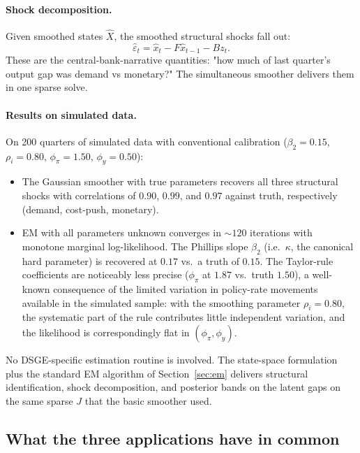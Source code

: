 \documentclass[11pt]{article}
\begin{document}
\paragraph{Shock decomposition.}  Given smoothed states $\widehat X$,
the smoothed structural shocks fall out:
\begin{equation}
\widehat\varepsilon_t=\widehat x_t-F\widehat x_{t-1}-B z_t.
\end{equation}
These are the central-bank-narrative quantities: "how much of last
quarter's output gap was demand vs monetary?"  The simultaneous
smoother delivers them in one sparse solve.

\paragraph{Results on simulated data.}  On 200 quarters of simulated
data with conventional calibration ($\beta_2=0.15$, $\rho_i=0.80$,
$\phi_\pi=1.50$, $\phi_y=0.50$):

\begin{itemize}[leftmargin=2em]
\item The Gaussian smoother with true parameters recovers all three
  structural shocks with correlations of $0.90$, $0.99$, and $0.97$
  against truth, respectively (demand, cost-push, monetary).
\item EM with all parameters unknown converges in $\sim 120$
  iterations with monotone marginal log-likelihood.  The Phillips
  slope $\beta_2$ (i.e.\ $\kappa$, the canonical hard parameter) is
  recovered at $0.17$ vs.\ a truth of $0.15$.  The Taylor-rule
  coefficients are noticeably less precise ($\phi_\pi$ at $1.87$
  vs.\ truth $1.50$), a well-known consequence of the limited
  variation in policy-rate movements available in the simulated
  sample: with the smoothing parameter $\rho_i=0.80$, the
  systematic part of the rule contributes little independent
  variation, and the likelihood is correspondingly flat in
  $(\phi_\pi,\phi_y)$.
\end{itemize}

No DSGE-specific estimation routine is involved.  The state-space
formulation plus the standard EM algorithm of Section~\ref{sec:em}
delivers structural identification, shock decomposition, and
posterior bands on the latent gaps on the same sparse $J$ that the
basic smoother used.

\subsection{What the three applications have in common}
\end{document}

